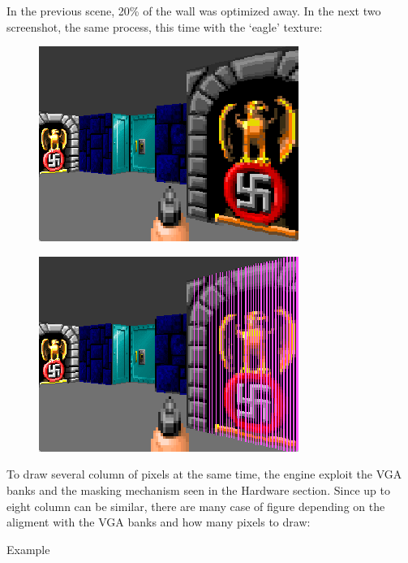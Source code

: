 \documentclass[book.tex]{subfiles}
\begin{document}
In the previous scene, 20\% of the wall was optimized away. In the next two screenshot, the same process, this time with the `eagle' texture:
\begin{figure}[H]
 \centering
 \includegraphics[scale=1.3]{imgs/post_optimization_2_show.png}
\end{figure}


\begin{figure}[H]
 \centering
 \includegraphics[scale=1.3]{imgs/post_optimization_2_pink_show.png}
\end{figure}
 
To draw several column of pixels at the same time, the engine exploit the VGA banks and the masking mechanism seen in the Hardware section.
Since up to eight column can be similar, there are many case of figure depending on the aligment with the VGA banks and how many pixels to draw:

Example
 
\end{document}
